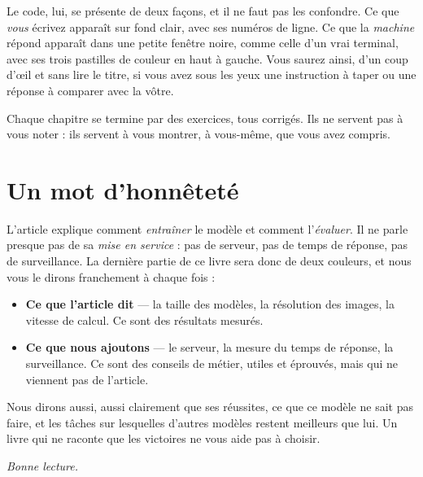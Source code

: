 Le code, lui, se présente de deux façons, et il ne faut pas les confondre.
Ce que \emph{vous} écrivez apparaît sur fond clair, avec ses numéros de
ligne. Ce que la \emph{machine} répond apparaît dans une petite fenêtre
noire, comme celle d'un vrai terminal, avec ses trois pastilles de couleur
en haut à gauche. Vous saurez ainsi, d'un coup d'œil et sans lire le titre,
si vous avez sous les yeux une instruction à taper ou une réponse à
comparer avec la vôtre.

Chaque chapitre se termine par des exercices, tous corrigés. Ils ne servent
pas à vous noter : ils servent à vous montrer, à vous-même, que vous avez
compris.

\section*{Un mot d'honnêteté}

L'article explique comment \emph{entraîner} le modèle et comment
l'\emph{évaluer}. Il ne parle presque pas de sa \emph{mise en service} : pas
de serveur, pas de temps de réponse, pas de surveillance. La dernière partie
de ce livre sera donc de deux couleurs, et nous vous le dirons franchement à
chaque fois :

\begin{itemize}
  \item \textbf{Ce que l'article dit} — la taille des modèles, la résolution
        des images, la vitesse de calcul. Ce sont des résultats mesurés.
  \item \textbf{Ce que nous ajoutons} — le serveur, la mesure du temps de
        réponse, la surveillance. Ce sont des conseils de métier, utiles et
        éprouvés, mais qui ne viennent pas de l'article.
\end{itemize}

Nous dirons aussi, aussi clairement que ses réussites, ce que ce modèle ne
sait pas faire, et les tâches sur lesquelles d'autres modèles restent
meilleurs que lui. Un livre qui ne raconte que les victoires ne vous aide
pas à choisir.

\vspace{1em}
\hfill\textit{Bonne lecture.}
\clearpage
